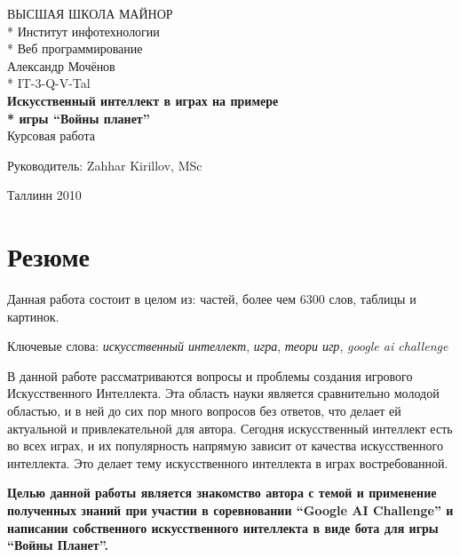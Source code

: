 \documentclass[12pt]{report}
\begin{document}

\begin{titlepage}
  \begin{center}
	\uppercase{Высшая школа майнор}\\*
	Институт инфотехнологии\\*
	Веб программирование\\[8cm]
	Александр Мочёнов\\*
	IT-3-Q-V-Tal\\[0.5cm]
	\large
	\textbf{Искусственный интеллект в играх на примере\\* игры ``Войны планет''}\\[1cm]
	\normalsize
	Курсовая работа\\[2cm]
	\begin{flushright}
		Руководитель: Zahhar Kirillov, MSc\\[7cm]
	\end{flushright}
	Таллинн 2010
  \end{center}
\end{titlepage}

\tableofcontents{\thispagestyle{fancyplain}}

\chapter*{Резюме}
\thispagestyle{fancy}

Данная работа состоит в целом из:  частей, более чем 6300 слов,  таблицы и  картинок.

Ключевые слова: \emph{искусственный интеллект}, \emph{игра}, \emph{теори игр}, \textsl{google ai challenge}

В данной работе рассматриваются вопросы и проблемы создания игрового Искусственного Интеллекта. Эта область науки является сравнительно молодой областью, и в ней до сих пор много вопросов без ответов, что делает ей актуальной и привлекательной для автора. Сегодня искусственный интеллект есть во всех играх, и их популярность напрямую зависит от качества искусственного интеллекта. Это делает тему искусственного интеллекта в играх востребованной.

\textbf{Целью данной работы является знакомство автора с темой и применение полученных знаний при участии в соревновании ``Google AI Challenge'' и написании собственного искусственного интеллекта в виде бота для игры ``Войны Планет''.}
\end{document}
